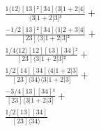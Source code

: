 \documentclass[varwidth, border=5pt]{standalone}
\begin{document}
\begin{my}
$\begin{gathered}
\scriptscriptstyle\frac{1⟨12⟩[13]²[34]⟨3|1+2|4]}{⟨3|1+2|3]³} +\\
\scriptscriptstyle\frac{-1/2[13]²[34]⟨1|2+3|4]}{[23]⟨3|1+2|3]²} +\\
\scriptscriptstyle\frac{1/4⟨12⟩[12][13][34]²}{[23]⟨3|1+2|3]²} +\\
\scriptscriptstyle\frac{1/2[14][34]⟨4|1+2|3]}{[23]⟨34⟩⟨3|1+2|3]} +\\
\scriptscriptstyle\frac{-3/4[13][34]²}{[23]⟨3|1+2|3]} +\\
\scriptscriptstyle\frac{1/2[13][34]}{[23]⟨34⟩} \phantom{+}
\end{gathered}$
\end{my}
\end{document}

